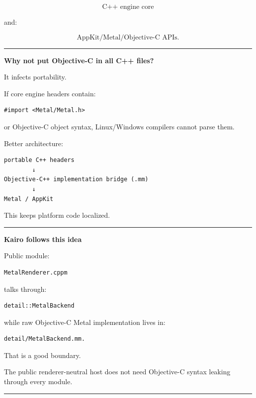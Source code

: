 \[
\text{C++ engine core}
\]

and:

\[
\text{AppKit/Metal/Objective-C APIs}.
\]

\begin{center}\rule{0.5\linewidth}{0.5pt}\end{center}

\textbf{Why not put Objective-C in all C++ files?}

It infects portability.

If core engine headers contain:

\begin{verbatim}
#import <Metal/Metal.h>
\end{verbatim}

or Objective-C object syntax, Linux/Windows compilers cannot parse them.

Better architecture:

\begin{verbatim}
portable C++ headers
        ↓
Objective-C++ implementation bridge (.mm)
        ↓
Metal / AppKit
\end{verbatim}

This keeps platform code localized.

\begin{center}\rule{0.5\linewidth}{0.5pt}\end{center}

\textbf{Kairo follows this idea}

Public module:

\begin{verbatim}
MetalRenderer.cppm
\end{verbatim}

talks through:

\begin{verbatim}
detail::MetalBackend
\end{verbatim}

while raw Objective-C Metal implementation lives in:

\begin{verbatim}
detail/MetalBackend.mm.
\end{verbatim}

That is a good boundary.

The public renderer-neutral host does not need Objective-C syntax leaking through every module.

\begin{center}\rule{0.5\linewidth}{0.5pt}\end{center}

